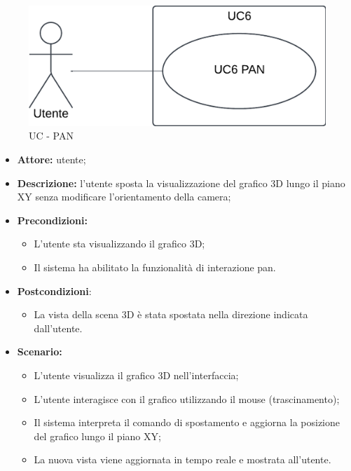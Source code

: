 \begin{figure}[h!]
    \centering
    \includegraphics[scale=0.7]{template/images/UC6.png}
    \caption{UC - PAN}
\end{figure}
\begin{itemize}
    \item \textbf{Attore:} utente;
    \item \textbf{Descrizione:} l'utente sposta la visualizzazione del grafico 3D lungo il piano XY senza modificare l'orientamento della camera;
    \item \textbf{Precondizioni:}
    \begin{itemize}
        \item L'utente sta visualizzando il grafico 3D;
        \item Il sistema ha abilitato la funzionalità di interazione pan.
    \end{itemize}
    \item \textbf{Postcondizioni}:
    \begin{itemize}
        \item La vista della scena 3D è stata spostata nella direzione indicata dall'utente.
    \end{itemize}
    \item \textbf{Scenario:}
    \begin{itemize}
        \item L'utente visualizza il grafico 3D nell'interfaccia;
        \item L'utente interagisce con il grafico utilizzando il mouse (trascinamento);
        \item Il sistema interpreta il comando di spostamento e aggiorna la posizione del grafico lungo il piano XY;
        \item La nuova vista viene aggiornata in tempo reale e mostrata all'utente.
    \end{itemize}
\end{itemize}



